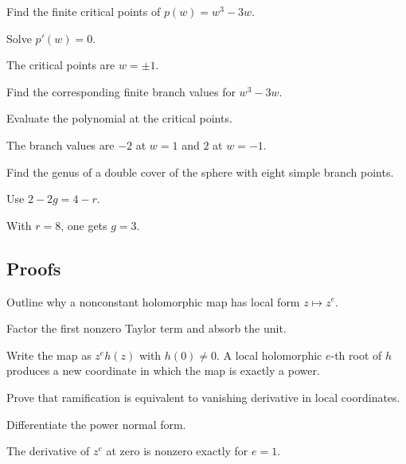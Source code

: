 \begin{exercise}\label{exr:iv24-expand-03}
Find the finite critical points of \(p(w)=w^3-3w\).
\end{exercise}
\begin{hint}
Solve \(p'(w)=0\).
\end{hint}
\begin{solution}
The critical points are \(w=\pm1\).
\end{solution}

\begin{exercise}\label{exr:iv24-expand-04}
Find the corresponding finite branch values for \(w^3-3w\).
\end{exercise}
\begin{hint}
Evaluate the polynomial at the critical points.
\end{hint}
\begin{solution}
The branch values are \(-2\) at \(w=1\) and \(2\) at \(w=-1\).
\end{solution}

\begin{exercise}\label{exr:iv24-expand-05}
Find the genus of a double cover of the sphere with eight simple branch points.
\end{exercise}
\begin{hint}
Use \(2-2g=4-r\).
\end{hint}
\begin{solution}
With \(r=8\), one gets \(g=3\).
\end{solution}

\subsection*{Proofs}

\begin{exercise}\label{exr:iv24-expand-06}
Outline why a nonconstant holomorphic map has local form \(z\mapsto z^e\).
\end{exercise}
\begin{hint}
Factor the first nonzero Taylor term and absorb the unit.
\end{hint}
\begin{solution}
Write the map as \(z^e h(z)\) with \(h(0)\ne0\). A local holomorphic \(e\)-th root of \(h\) produces a new coordinate in which the map is exactly a power.
\end{solution}

\begin{exercise}\label{exr:iv24-expand-07}
Prove that ramification is equivalent to vanishing derivative in local coordinates.
\end{exercise}
\begin{hint}
Differentiate the power normal form.
\end{hint}
\begin{solution}
The derivative of \(z^e\) at zero is nonzero exactly for \(e=1\).
\end{solution}

